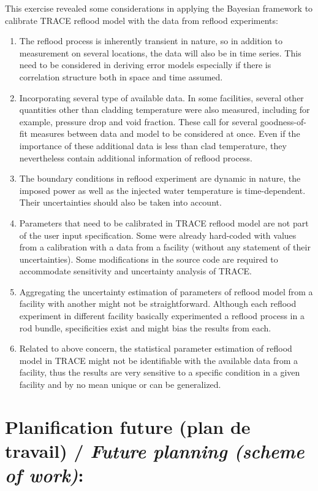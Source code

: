 \documentclass[11pt,titlepage]{article}
\begin{document}
This exercise revealed some considerations in applying the Bayesian framework to calibrate TRACE reflood model with the data from reflood experiments:
\begin{enumerate}
	\item The reflood process is inherently transient in nature, so in addition to measurement on several locations, the data will also be in time series. 
	This need to be considered in deriving error models especially if there is correlation structure both in space and time assumed.
	\item Incorporating several type of available data. 
	In some facilities, several other quantities other than cladding temperature were also measured, including for example, pressure drop and void fraction. 
	These call for several goodness-of-fit measures between data and model to be considered at once. 
	Even if the importance of these additional data is less than clad temperature, they nevertheless contain additional information of reflood process.
	\item The boundary conditions in reflood experiment are dynamic in nature, the imposed power as well as the injected water temperature is time-dependent. 
	Their uncertainties should also be taken into account.
	\item Parameters that need to be calibrated in TRACE reflood model are not part of the user input specification. 
	Some were already hard-coded with values from a calibration with a data from a facility (without any statement of their uncertainties). 
	Some modifications in the source code are required to accommodate sensitivity and uncertainty analysis of TRACE.
	\item Aggregating the uncertainty estimation of parameters of reflood model from a facility with another might not be straightforward. 
	Although each reflood experiment in different facility basically experimented a reflood process in a rod bundle, specificities exist and might bias the results from each.
	\item Related to above concern, the statistical parameter estimation of reflood model in TRACE might not be identifiable with the available data from a facility, thus the results are very sensitive to a specific condition in a given facility and by no mean unique or can be generalized.
\end{enumerate}

\newpage
\section{Planification future (plan de travail) /  {\large\textit{Future planning (scheme of work)}}:}
\end{document}
